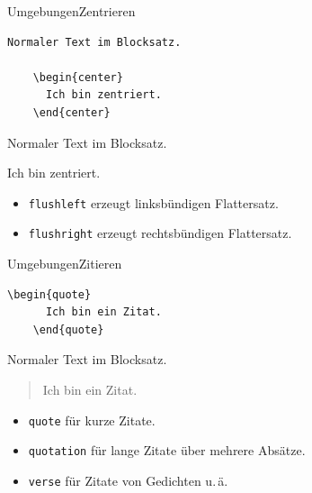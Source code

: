 \begin{Frame}[fragile]{Umgebungen}{Zentrieren}
  \begin{lstlisting}[gobble=4]
    Normaler Text im Blocksatz.

    \begin{center}
      Ich bin zentriert.
    \end{center}
  \end{lstlisting}

  \xxx

  \begin{minipage}{\textwidth}
    Normaler Text im Blocksatz.
    \lorem
  \end{minipage}  

  \begin{center}
    Ich bin zentriert. \lorem
  \end{center}

  \pause

  \begin{itemize}
    \item \lstinline-flushleft- erzeugt \alert{linksbündigen Flattersatz}.
    \item \lstinline-flushright- erzeugt \alert{rechtsbündigen Flattersatz}.
  \end{itemize}
\end{Frame}

\begin{Frame}[fragile]{Umgebungen}{Zitieren}
  \begin{lstlisting}[gobble=4]
    \begin{quote}
      Ich bin ein Zitat.
    \end{quote}
  \end{lstlisting}

  \xxx

  \begin{minipage}{\textwidth}
    Normaler Text im Blocksatz.
    \lorem
  \end{minipage}

  \begin{quote}
    Ich bin ein Zitat. \lorem
  \end{quote}

  \pause

  \begin{itemize}
    \item \lstinline-quote- für \alert{kurze Zitate}.
    \item \lstinline-quotation- für \alert{lange Zitate} über mehrere Absätze.
    \item \lstinline-verse- für Zitate von \alert{Gedichten} u.\,ä.
  \end{itemize}
\end{Frame}

